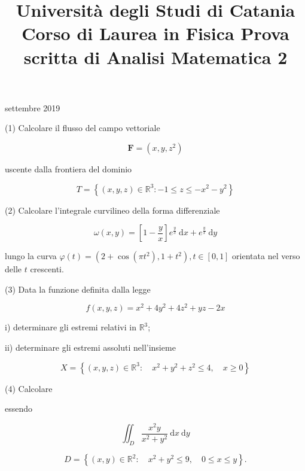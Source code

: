 \documentclass[10pt]{article}
\title{Università degli Studi di Catania 
 Corso di Laurea in Fisica 
 Prova scritta di Analisi Matematica 2 }
\author{}
\date{}
\begin{document}
 settembre 2019

(1) Calcolare il flusso del campo vettoriale

\[
\mathbf{F}=\left(x, y, z^{2}\right)
\]

uscente dalla frontiera del dominio

\[
T=\left\{(x, y, z) \in \mathbb{R}^{3}:-1 \leq z \leq-x^{2}-y^{2}\right\}
\]

(2) Calcolare l'integrale curvilineo della forma differenziale

\[
\omega(x, y)=\left[1-\frac{y}{x}\right] e^{\frac{y}{x}} \mathrm{~d} x+e^{\frac{y}{x}} \mathrm{~d} y
\]

lungo la curva \(\varphi(t)=\left(2+\cos \left(\pi t^{2}\right), 1+t^{2}\right), t \in[0,1]\) orientata nel verso delle \(t\) crescenti.

(3) Data la funzione definita dalla legge

\[
f(x, y, z)=x^{2}+4 y^{2}+4 z^{2}+y z-2 x
\]

i) determinare gli estremi relativi in \(\mathbb{R}^{3}\);

ii) determinare gli estremi assoluti nell'insieme

\[
X=\left\{(x, y, z) \in \mathbb{R}^{3}: \quad x^{2}+y^{2}+z^{2} \leq 4, \quad x \geq 0\right\}
\]

(4) Calcolare

essendo

\[
\iint_{D} \frac{x^{2} y}{x^{2}+y^{2}} \mathrm{~d} x \mathrm{~d} y
\]

\[
D=\left\{(x, y) \in \mathbb{R}^{2}: \quad x^{2}+y^{2} \leq 9, \quad 0 \leq x \leq y\right\} .
\]
\end{document}
